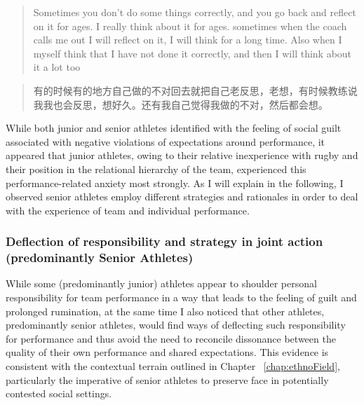 \begin{CJK}{UTF8}{gbsn}
      \begin{quote}
        Sometimes you don't do some things correctly, and you go back and reflect on it for ages. I really think about it for ages. sometimes when the coach calls me out I will reflect on it, I will think for a long time. Also when I myself think that I have not done it correctly, and then I will think about it a lot too
      \end{quote}

      \begin{quote}
        有的时候有的地方自己做的不对回去就把自己老反思，老想，有时候教练说我我也会反思，想好久。还有我自己觉得我做的不对，然后都会想。
      \end{quote}


While both junior and senior athletes identified with the feeling of social guilt associated with negative violations of expectations around performance, it appeared that junior athletes, owing to their relative inexperience with rugby and their position in the relational hierarchy of the team, experienced this performance-related anxiety most strongly.  As I will explain in the following, I observed senior athletes employ different strategies and rationales in order to deal with the experience of team and individual performance.

\subsubsection{Deflection of responsibility and strategy in joint action (predominantly Senior Athletes)\label{sect:seniorDeflection}}

While some (predominantly junior) athletes appear to shoulder personal responsibility for team performance in a way that leads to the feeling of guilt and prolonged rumination, at the same time I also noticed that other athletes, predominantly senior athletes, would find ways of deflecting such responsibility for performance and thus avoid the need to reconcile dissonance between the quality of their own performance and shared expectations.  This evidence is consistent with the contextual terrain outlined in Chapter ~\ref{chap:ethnoField}, particularly the imperative of senior athletes to preserve face in potentially contested social settings.


\end{CJK}
